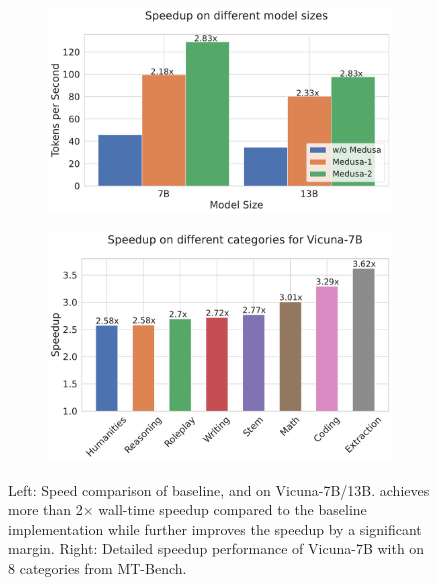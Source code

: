
\begin{figure}[h]
     \centering
     \begin{subfigure}[b]{0.45\textwidth}
         \centering
         \includegraphics[width=\textwidth]{speedup_model_sizes_wide.pdf}
         \caption{}
         \label{fig:speedup_model_sizes}
     \end{subfigure}
     \begin{subfigure}[b]{0.45\textwidth}
         \centering
         \includegraphics[width=\textwidth]{speedup_per_class_wide.pdf}
         \caption{}
         \label{fig:speedup_per_class}
     \end{subfigure}
        \caption{Left: Speed comparison of baseline,  and  on Vicuna-7B/13B.  achieves more than 2$\times$ wall-time speedup compared to the baseline implementation while  further improves the speedup by a significant margin. Right: Detailed speedup performance of Vicuna-7B with \textcolor{black}{} on 8 categories from MT-Bench.}
        \label{fig:ablation_tree}
\end{figure}

